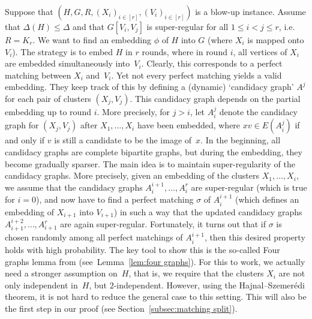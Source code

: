\documentclass[10pt]{amsart}
\theoremstyle{definition}
\theoremstyle{claimstyle}
\theoremstyle{stepstyle}
\numberwithin{equation}{section}
\begin{document}
Suppose that $(H,G,R,(X_i)_{i\in[r]},(V_i)_{i\in[r]})$ is a blow-up instance.
Assume that $\Delta(H)\le \Delta$ and that $G[V_i,V_j]$ is super-regular for all $1\le i<j\le r$, i.e.~$R=K_r$.
We want to find an embedding $\phi$ of $H$ into $G$ (where $X_i$ is mapped onto $V_i$).
The strategy is to embed $H$ in $r$ rounds, where in round $i$, all vertices of $X_i$ are embedded simultaneously into~$V_i$. Clearly, this corresponds to a perfect matching between $X_i$ and~$V_i$.
Yet not every perfect matching yields a valid embedding. They keep track of this by defining a (dynamic) `candidacy graph' $A^j$ for each pair of clusters $(X_j,V_j)$. This candidacy graph depends on the partial embedding up to round $i$.
More precisely, for $j>i$, let $A_i^j$ denote the candidacy graph for $(X_j,V_j)$ after $X_1,\dots,X_i$ have been embedded, where $xv\in E(A_i^j)$ if and only if $v$ is still a candidate to be the image of~$x$.
In the beginning, all candidacy graphs are complete bipartite graphs, but during the embedding, they become gradually sparser. 
The main idea is to maintain super-regularity of the candidacy graphs.
More precisely, given an embedding of the clusters $X_1,\dots,X_i$, we assume that the candidacy graphs $A_{i}^{i+1},\dots,A_i^{r}$ are super-regular (which is true for $i=0$), and now have to find a perfect matching $\sigma$ of $A_i^{i+1}$ (which defines an embedding of $X_{i+1}$ into $V_{i+1}$) in such a way that the updated candidacy graphs $A_{i+1}^{i+2},\dots,A_{i+1}^{r}$ are again super-regular.
Fortunately, it turns out that if $\sigma$ is chosen randomly among all perfect matchings of $A_i^{i+1}$, then this desired property holds with high probability.
The key tool to show this is the so-called Four graphs lemma from \cite{RR:99} (see~Lemma~\ref{lem:four graphs}).
For this to work, we actually need a stronger assumption on~$H$, that is, we require that the clusters $X_i$ are not only independent in~$H$, but $2$-independent. However, using the Hajnal--Szemer\'edi theorem, it is not hard to reduce the general case to this setting. This will also be the first step in our proof (see Section~\ref{subsec:matching split}).
\end{document}
